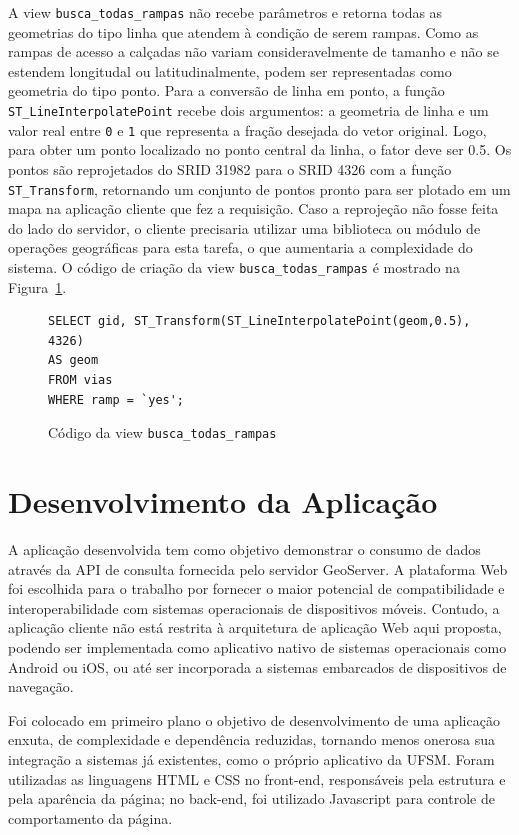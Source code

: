 \documentclass[oneside,openright,12pt]{ufsm_2015} %
\begin{document}
A view {\tt busca\_todas\_rampas} não recebe parâmetros e retorna todas as geometrias do tipo linha que atendem à condição de serem rampas. 
Como as rampas de acesso a calçadas não variam consideravelmente de tamanho e não se estendem longitudal ou latitudinalmente, podem ser representadas como geometria do tipo ponto. 
Para a conversão de linha em ponto, a função {\tt ST\_LineInterpolatePoint} recebe dois argumentos: a geometria de linha e um valor real entre {\tt 0} e {\tt 1} que representa a fração desejada do vetor original. 
Logo, para obter um ponto localizado no ponto central da linha, o fator deve ser 0.5. 
Os pontos são reprojetados do SRID 31982 para o SRID 4326 com a função {\tt ST\_Transform}, retornando um conjunto de pontos pronto para ser plotado em um mapa na aplicação cliente que fez a requisição. 
Caso a reprojeção não fosse feita do lado do servidor, o cliente precisaria utilizar uma biblioteca ou módulo de operações geográficas para esta tarefa, o que aumentaria a complexidade do sistema.
O código de criação da view {\tt busca\_todas\_rampas} é mostrado na Figura~\ref{codigo:view_rampas}.

\begin{figure}[h!]
    \centering
     \caption{Código da view {\tt busca\_todas\_rampas}}
    \label{codigo:view_rampas}
\begin{lstlisting}[]
SELECT gid, ST_Transform(ST_LineInterpolatePoint(geom,0.5), 4326)
AS geom
FROM vias
WHERE ramp = `yes';
\end{lstlisting}
\end{figure}

   

\section{Desenvolvimento da Aplicação}

A aplicação desenvolvida tem como objetivo demonstrar o consumo de dados através da API de consulta fornecida pelo servidor GeoServer. 
A plataforma Web foi escolhida para o trabalho por fornecer o maior potencial de compatibilidade e interoperabilidade com sistemas operacionais de dispositivos móveis. 
Contudo, a aplicação cliente não está restrita à arquitetura de aplicação Web aqui proposta, podendo ser implementada como aplicativo nativo de sistemas operacionais como Android ou iOS, ou até ser incorporada a sistemas embarcados de dispositivos de navegação.

Foi colocado em primeiro plano o objetivo de desenvolvimento de uma aplicação enxuta, de complexidade e dependência reduzidas, tornando menos onerosa sua integração a sistemas já existentes, como o próprio aplicativo da UFSM. Foram utilizadas as linguagens HTML e CSS no front-end, responsáveis pela estrutura e pela aparência da página; no back-end, foi utilizado Javascript para controle de comportamento da página.
\end{document}
